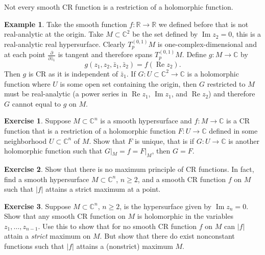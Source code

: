 \documentclass[12pt,openany]{book}
\renewcommand{\Re}{\operatorname{Re}}
\renewcommand{\Im}{\operatorname{Im}}
\newcommand{\sabs}[1]{\lvert {#1} \rvert}
\newcommand{\C}{{\mathbb{C}}}
\newcommand{\R}{{\mathbb{R}}}
\theoremstyle{plain}
\theoremstyle{remark}
\theoremstyle{definition}
\newenvironment{exbox}{%
    \def\FrameCommand{\vrule width 1pt \relax\hspace {10pt}}%
    \MakeFramed {\advance \hsize -\width \FrameRestore }%
}{%
    \endMakeFramed
}
\theoremstyle{exercise}
\newtheorem{exercise}{Exercise}[section]
\theoremstyle{example}
\newtheorem{example}[thm]{Example}
\begin{document}
Not every smooth CR function is a restriction of a holomorphic function.

\begin{example}
Take the smooth function $f \colon \R \to \R$ we defined before
that is not real-analytic at the origin.
Take $M \subset \C^2$ be the set defined by $\Im z_2 = 0$, this is a
real-analytic real hypersurface.  Clearly
$T_p^{(0,1)} M$ is one-complex-dimensional and at each point
$\frac{\partial}{\partial \bar{z}_1}$ is tangent and therefore spans
$T_p^{(0,1)} M$.  Define $g \colon M \to \C$ by
\begin{equation*}
g(z_1,z_2,\bar{z}_1,\bar{z}_2) = f(\Re z_2) .
\end{equation*}
Then $g$ is CR as it is independent of $\bar{z}_1$.
If $G \colon U \subset \C^2 \to \C$ is a holomorphic
function where $U$ is some open set containing the origin, then $G$
restricted to $M$ must be real-analytic (a power series in $\Re z_1$, $\Im
z_1$, and $\Re z_2$) and therefore $G$ cannot equal to 
$g$ on $M$.
\end{example}

\begin{exbox}
\begin{exercise}
Suppose $M \subset \C^n$ is a smooth hypersurface
and $f \colon M \to \C$ is a CR function that is a restriction
of a holomorphic function $F \colon U \to \C$ defined in
some neighborhood $U \subset \C^n$ of $M$.  Show that $F$ is unique,
that is if $G \colon U \to \C$ is another holomorphic function such that
$G|_M = f = F|_M$, then $G=F$.
\end{exercise}

\begin{exercise}
Show that there is no maximum principle of CR functions.  In fact, find a
smooth hypersurface $M \subset \C^n$, $n \geq 2$, and a smooth CR function
$f$ on $M$ such that $\sabs{f}$ attains a strict maximum at a point.
\end{exercise}

\begin{exercise}
Suppose $M \subset \C^n$, $n \geq 2$, is the hypersurface given by $\Im z_n
= 0$.  Show that any smooth CR function on $M$ is holomorphic in the variables
$z_1,\ldots,z_{n-1}$.  Use this to show that for no smooth CR function $f$ on $M$ can
$\sabs{f}$ attain a \emph{strict} maximum on $M$.  But show that there do
exist nonconstant functions such that $\sabs{f}$ attains a (nonstrict) maximum $M$.
\end{exercise}
\end{exbox}
\end{document}
